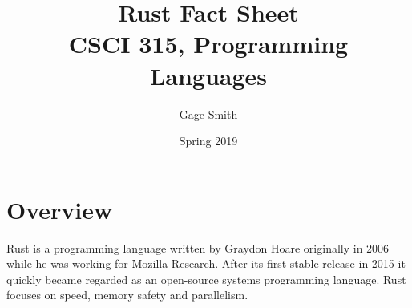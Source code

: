 \documentclass{article}
\begin{document}
\title{Rust Fact Sheet \\ \large{\sc CSCI 315, Programming Languages}}
\author{Gage Smith}
\date{Spring 2019}
\maketitle




\section*{Overview}
Rust is a programming language written by Graydon Hoare originally in 2006 while he was working for Mozilla Research. After its first stable release in 2015 it quickly became regarded as an open-source systems programming language. Rust focuses on speed, memory safety and parallelism. \cite{wiki:rust}
\end{document}
